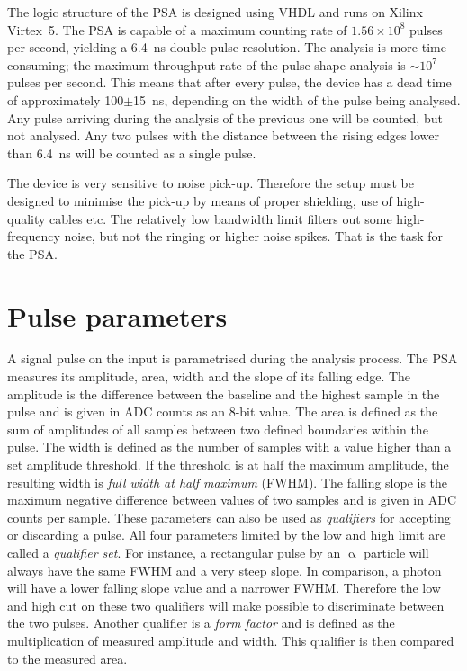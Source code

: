 \documentclass[12pt]{packages/mytustyle}  %
\begin{document}
The logic structure of the PSA is designed using VHDL and runs on Xilinx Virtex~5. The PSA is capable of a maximum counting rate of $1.56\times10^8$ pulses per second, yielding a 6.4~ns double pulse resolution. The analysis is more time consuming; the maximum throughput rate of the pulse shape analysis is $\sim10^7$ pulses per second. This means that after every pulse, the device has a dead time of approximately 100$\pm$15~ns, depending on the width of the pulse being analysed. Any pulse arriving during the analysis of the previous one will be counted, but not analysed. Any two pulses with the distance between the rising edges lower than 6.4~ns will be counted as a single pulse.

The device is very sensitive to noise pick-up. Therefore the setup must be designed to minimise the pick-up by means of proper shielding, use of high-quality cables etc. The relatively low bandwidth limit filters out some high-frequency noise, but not the ringing or higher noise spikes. That is the task for the PSA.

\section{Pulse parameters}
A signal pulse on the input is parametrised during the analysis process. The PSA measures its amplitude, area, width and the slope of its falling edge. The amplitude is the difference between the baseline and the highest sample in the pulse and is given in ADC counts as an 8-bit value. The area is defined as the sum of amplitudes of all samples between two defined boundaries within the pulse. The width is defined as the number of samples with a value higher than a set amplitude threshold. If the threshold is at half the maximum amplitude, the resulting width is \emph{full width at half maximum} (FWHM). The falling slope is the maximum negative difference between values of two samples and is given in ADC counts per sample. These parameters can also be used as \emph{qualifiers} for accepting or discarding a pulse. All four parameters limited by the low and high limit are called a \emph{qualifier set}. For instance, a rectangular pulse by an $\upalpha$ particle will always have the same FWHM and a very steep slope. In comparison, a photon will have a lower falling slope value and a narrower FWHM. Therefore the low and high cut on these two qualifiers will make possible to discriminate between the two pulses. Another qualifier is a \emph{form factor} and is defined as the multiplication of measured amplitude and width. This qualifier is then compared to the measured area.
\end{document}
